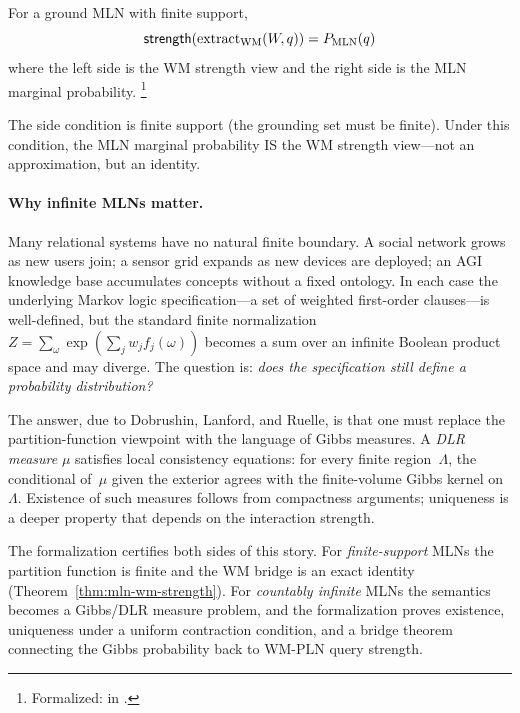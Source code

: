 \documentclass[11pt,openany]{report}
\begin{document}
\begin{theorem}
\label{thm:mln-wm-strength}
For a ground MLN with finite support,
\[
  \mathsf{strength}(\mathrm{extract}_{\mathrm{WM}}(W, q))
  = P_{\mathrm{MLN}}(q)
\]
where the left side is the WM strength view and the right side is
the MLN marginal probability.%
\footnote{Formalized:
in .}
\end{theorem}

\noindent
The side condition is finite support (the grounding set must be
finite).  Under this condition, the MLN marginal probability IS
the WM strength view---not an approximation, but an identity.

\paragraph{Why infinite MLNs matter.}
Many relational systems have no natural finite boundary.  A social network
grows as new users join; a sensor grid expands as new devices are deployed;
an AGI knowledge base accumulates concepts without a fixed ontology.  In each
case the underlying Markov logic specification---a set of weighted first-order
clauses---is well-defined, but the standard finite normalization
$Z = \sum_{\omega}\exp(\sum_j w_j f_j(\omega))$ becomes a sum over an infinite
Boolean product space and may diverge.  The question is: \emph{does the
specification still define a probability distribution?}

The answer, due to Dobrushin, Lanford, and Ruelle, is that one must replace
the partition-function viewpoint with the language of Gibbs measures.  A
\emph{DLR measure} $\mu$ satisfies local consistency equations: for every
finite region~$\Lambda$, the conditional of~$\mu$ given the exterior agrees
with the finite-volume Gibbs kernel on~$\Lambda$.  Existence of such measures
follows from compactness arguments; uniqueness is a deeper property that
depends on the interaction strength.

The formalization certifies both sides of this story.  For
\emph{finite-support} MLNs the partition function is finite and the WM bridge
is an exact identity (Theorem~\ref{thm:mln-wm-strength}).  For
\emph{countably infinite} MLNs the semantics becomes a Gibbs/DLR measure
problem, and the formalization proves existence, uniqueness under a uniform
contraction condition, and a bridge theorem connecting the Gibbs probability
back to WM-PLN query strength.
\end{document}

